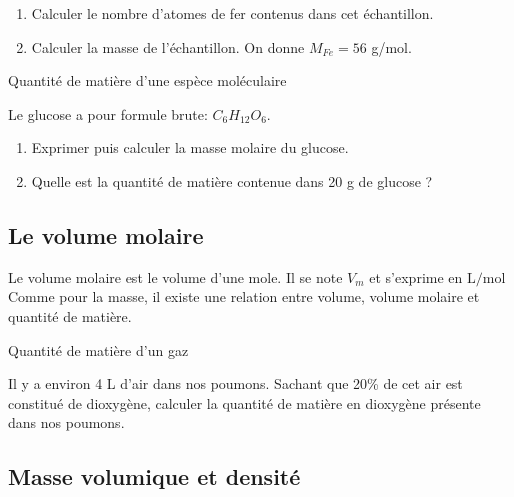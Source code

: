 \begin{enumerate}
    \item Calculer le nombre d'atomes de fer contenus dans cet échantillon.
    \item Calculer la masse de l'échantillon. On donne $M_{Fe}=56$ g/mol.
\end{enumerate}

 Quantité de matière d'une espèce moléculaire

Le glucose a pour formule brute: $C_6H_{12}O_6$.

\begin{enumerate}
    \item Exprimer puis calculer la masse molaire du glucose.
    \item Quelle est la quantité de matière contenue dans 20 g de glucose ?
\end{enumerate}

\subsection{Le volume molaire}
Le volume molaire est le volume d'une mole. Il se note $V_m$ et s'exprime en $\si{\liter\per\mole}$\\
Comme pour la masse, il existe une relation entre volume, volume molaire et quantité de matière.\\


 Quantité de matière d'un gaz

Il y a environ 4 L d'air dans nos poumons. Sachant que 20\% de cet air
est constitué de dioxygène, calculer la quantité de matière en dioxygène
présente dans nos poumons.
\subsection{Masse volumique et densité}


